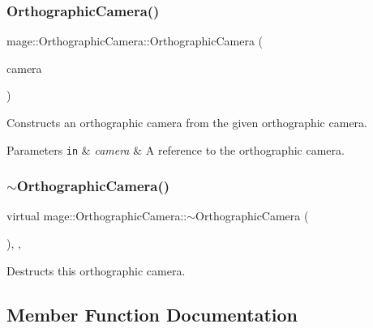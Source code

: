 \subsubsection{\texorpdfstring{Orthographic\+Camera()}{OrthographicCamera()}\hspace{0.1cm}{\footnotesize\ttfamily [2/2]}}
{\footnotesize\ttfamily mage\+::\+Orthographic\+Camera\+::\+Orthographic\+Camera (\begin{DoxyParamCaption}\item[{const \hyperlink{classmage_1_1_orthographic_camera}{Orthographic\+Camera} \&}]{camera }\end{DoxyParamCaption})\hspace{0.3cm}{\ttfamily [private]}}

Constructs an orthographic camera from the given orthographic camera.


\begin{DoxyParams}[1]{Parameters}
\mbox{\tt in}  & {\em camera} & A reference to the orthographic camera. \\
\hline
\end{DoxyParams}
\hypertarget{classmage_1_1_orthographic_camera_abdad923634e17f217ba975a9149f6c57}{}\label{classmage_1_1_orthographic_camera_abdad923634e17f217ba975a9149f6c57} 
\subsubsection{\texorpdfstring{$\sim$\+Orthographic\+Camera()}{~OrthographicCamera()}}
{\footnotesize\ttfamily virtual mage\+::\+Orthographic\+Camera\+::$\sim$\+Orthographic\+Camera (\begin{DoxyParamCaption}{ }\end{DoxyParamCaption})\hspace{0.3cm}{\ttfamily [private]}, {\ttfamily [virtual]}, {\ttfamily [default]}}

Destructs this orthographic camera. 

\subsection{Member Function Documentation}
\hypertarget{classmage_1_1_orthographic_camera_ae075c08e4af88f74212bf5c84d2e5b2a}{}\label{classmage_1_1_orthographic_camera_ae075c08e4af88f74212bf5c84d2e5b2a} 
